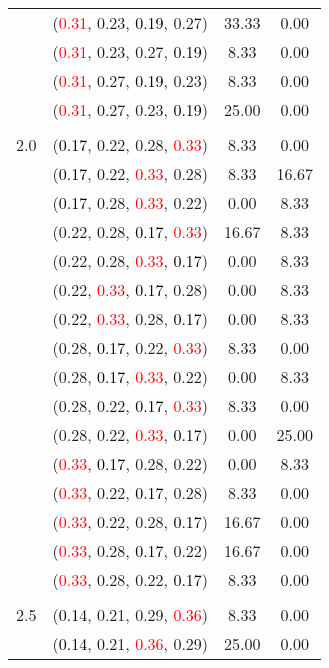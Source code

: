 \documentclass[10pt,a4paper]{report}
\begin{document}
\begin{center}
\begin{longtable}{clcc}
			&(\textcolor{red}{0.31}, 0.23, \textcolor{black}{0.19}, 0.27)&33.33&0.00\\
			&(\textcolor{red}{0.31}, 0.23, 0.27, \textcolor{black}{0.19})&8.33&0.00\\
			&(\textcolor{red}{0.31}, 0.27, \textcolor{black}{0.19}, 0.23)&8.33&0.00\\
			&(\textcolor{red}{0.31}, 0.27, 0.23, \textcolor{black}{0.19})&25.00&0.00\\
		&&&\\
		2.0			&(\textcolor{black}{0.17}, 0.22, 0.28, \textcolor{red}{0.33})&8.33&0.00\\
			&(\textcolor{black}{0.17}, 0.22, \textcolor{red}{0.33}, 0.28)&8.33&16.67\\
			&(\textcolor{black}{0.17}, 0.28, \textcolor{red}{0.33}, 0.22)&0.00&8.33\\
			&(0.22, 0.28, \textcolor{black}{0.17}, \textcolor{red}{0.33})&16.67&8.33\\
			&(0.22, 0.28, \textcolor{red}{0.33}, \textcolor{black}{0.17})&0.00&8.33\\
			&(0.22, \textcolor{red}{0.33}, \textcolor{black}{0.17}, 0.28)&0.00&8.33\\
			&(0.22, \textcolor{red}{0.33}, 0.28, \textcolor{black}{0.17})&0.00&8.33\\
			&(0.28, \textcolor{black}{0.17}, 0.22, \textcolor{red}{0.33})&8.33&0.00\\
			&(0.28, \textcolor{black}{0.17}, \textcolor{red}{0.33}, 0.22)&0.00&8.33\\
			&(0.28, 0.22, \textcolor{black}{0.17}, \textcolor{red}{0.33})&8.33&0.00\\
			&(0.28, 0.22, \textcolor{red}{0.33}, \textcolor{black}{0.17})&0.00&25.00\\
			&(\textcolor{red}{0.33}, \textcolor{black}{0.17}, 0.28, 0.22)&0.00&8.33\\
			&(\textcolor{red}{0.33}, 0.22, \textcolor{black}{0.17}, 0.28)&8.33&0.00\\
			&(\textcolor{red}{0.33}, 0.22, 0.28, \textcolor{black}{0.17})&16.67&0.00\\
			&(\textcolor{red}{0.33}, 0.28, \textcolor{black}{0.17}, 0.22)&16.67&0.00\\
			&(\textcolor{red}{0.33}, 0.28, 0.22, \textcolor{black}{0.17})&8.33&0.00\\
		&&&\\
		2.5			&(\textcolor{black}{0.14}, 0.21, 0.29, \textcolor{red}{0.36})&8.33&0.00\\
			&(\textcolor{black}{0.14}, 0.21, \textcolor{red}{0.36}, 0.29)&25.00&0.00\\

\end{longtable}
\end{center}
\end{document}
